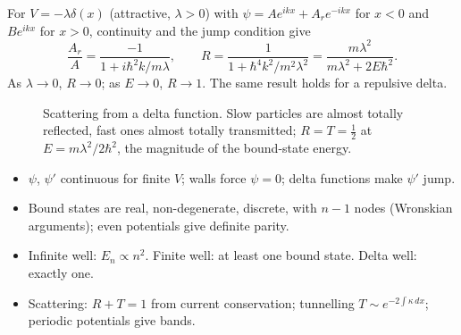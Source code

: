 \begin{example}
For $V = -\lambda\delta(x)$ (attractive, $\lambda>0$) with $\psi = Ae^{ikx}+A_re^{-ikx}$ for $x<0$ and $Be^{ikx}$ for $x>0$, continuity and the jump condition give
\[
    \frac{A_r}{A} = \frac{-1}{1+i\hbar^2k/m\lambda},
    \qquad
    R = \frac{1}{1+\hbar^4k^2/m^2\lambda^2} = \frac{m\lambda^2}{m\lambda^2+2E\hbar^2}.
\]
As $\lambda\to0$, $R\to0$; as $E\to0$, $R\to1$. The same result holds for a repulsive delta.
\end{example}

\begin{figure}[ht]
\centering
{}
\caption{Scattering from a delta function. Slow particles are almost totally reflected, fast ones almost totally transmitted; $R = T = \frac12$ at $E = m\lambda^2/2\hbar^2$, the magnitude of the bound-state energy.}
\end{figure}

\begin{fact}
\leavevmode
\begin{itemize}
\item $\psi$, $\psi'$ continuous for finite $V$; walls force $\psi = 0$; delta functions make $\psi'$ jump.
\item Bound states are real, non-degenerate, discrete, with $n-1$ nodes (Wronskian arguments); even potentials give definite parity.
\item Infinite well: $E_n\propto n^2$. Finite well: at least one bound state. Delta well: exactly one.
\item Scattering: $R + T = 1$ from current conservation; tunnelling $T\sim e^{-2\int\kappa\,dx}$; periodic potentials give bands.
\end{itemize}
\end{fact}
